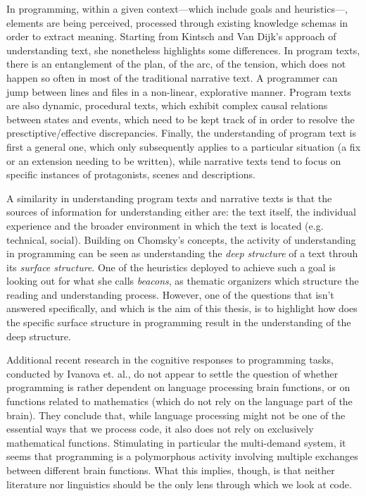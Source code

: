 \documentclass{article}
\begin{document}
In programming, within a given context—which include goals and heuristics—, elements are being perceived, processed through existing knowledge schemas in order to extract meaning. Starting from Kintsch and Van Dijk's approach of understanding text\cite{kintsch_toward_1978}, she nonetheless highlights some differences. In program texts, there is an entanglement of the plan, of the arc, of the tension, which does not happen so often in most of the traditional narrative text. A programmer can jump between lines and files in a non-linear, explorative manner. Program texts are also dynamic, procedural texts, which exhibit complex causal relations between states and events, which need to be kept track of in order to resolve the presctiptive/effective discrepancies. Finally, the understanding of program text is first a general one, which only subsequently applies to a particular situation (a fix or an extension needing to be written), while narrative texts tend to focus on specific instances of protagonists, scenes and descriptions.

A similarity in understanding program texts and narrative texts is that the sources of information for understanding either are: the text itself, the individual experience and the broader environment in which the text is located (e.g. technical, social). Building on Chomsky's concepts, the activity of understanding in programming can be seen as understanding the \emph{deep structure} of a text throuh its \emph{surface structure}\cite{chomsky_aspects_1965}. One of the heuristics deployed to achieve such a goal is looking out for what she calls \emph{beacons}, as thematic organizers which structure the reading and understanding process. However, one of the questions that isn't answered specifically, and which is the aim of this thesis, is to highlight how does the specific surface structure in programming result in the understanding of the deep structure.

Additional recent research in the cognitive responses to programming tasks, conducted by Ivanova et. al., do not appear to settle the question of whether programming is rather dependent on language processing brain functions, or on functions related to mathematics (which do not rely on the language part of the brain)\cite{ivanova_comprehension_2020}. They conclude that, while language processing might not be one of the essential ways that we process code, it also does not rely on exclusively mathematical functions. Stimulating in particular the multi-demand system, it seems that programming is a polymorphous activity involving multiple exchanges between different brain functions. What this implies, though, is that neither literature nor linguistics should be the only lens through which we look at code.
\end{document}
